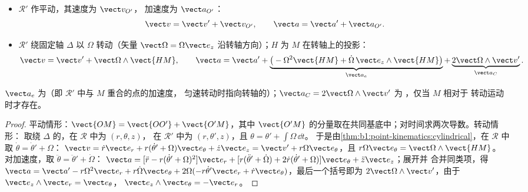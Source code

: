\begin{theorem}[速度与加速度的合成]\label{thm:b1:non-inertial-frames:composition}
\begin{itemize}
  \item $\mathcal R'$ 作平动，其速度为 $\vect v_{O'}$，
        加速度为 $\vect a_{O'}$：
        \[
        \vect v = \vect v' + \vect v_{O'}, \qquad \vect a = \vect a' + \vect a_{O'} .
        \]
  \item $\mathcal R'$ 绕固定轴 $\Delta$ 以 $\Omega$ 转动（矢量
        $\vect\Omega = \Omega\vect e_z$ 沿转轴方向）；$H$ 为
        $M$ 在转轴上的投影：
        \[
        \vect v = \vect v' + \vect\Omega\wedge\vect{HM}, \qquad
        \vect a = \vect a' + \underbrace{\big(-\Omega^2\vect{HM} + \dot\Omega\,\vect e_z\wedge\vect{HM}\big)}_{\vect a_e}
        + \underbrace{2\vect\Omega\wedge\vect v'}_{\vect a_C} .
        \]
\end{itemize}
$\vect a_e$ 为\emph{}（即
$\mathcal R'$ 中与 $M$ 重合的点的加速度，
匀速转动时指向转轴的）；$\vect a_C = 2\vect\Omega\wedge\vect v'$ 为
\emph{}，仅当 $M$ 相对于
转动运动时才存在。
\end{theorem}

\begin{proof}
平动情形：$\vect{OM} = \vect{OO'} + \vect{O'M}$，其中
$\vect{O'M}$ 的分量取在共同基底中；对时间求两次导数。转动情形：
取绕 $\Delta$ 的，在 $\mathcal R$ 中为 $(r, \theta, z)$，
在 $\mathcal R'$ 中为 $(r, \theta', z)$，且 $\theta = \theta' + \int\Omega\,\dd t$。
于是由\cref{thm:b1:point-kinematics:cylindrical}，在 $\mathcal R$ 中取
$\dot\theta = \dot\theta' + \Omega$：
$\vect v = \dot r\vect e_r + r(\dot\theta' + \Omega)\vect e_\theta + \dot z\vect e_z
= \vect v' + r\Omega\vect e_\theta$，且 $r\Omega\vect e_\theta = \vect\Omega\wedge\vect{HM}$。
对加速度，取 $\ddot\theta = \ddot\theta' + \dot\Omega$：
$\vect a = [\ddot r - r(\dot\theta' + \Omega)^2]\vect e_r + [r(\ddot\theta' + \dot\Omega)
+ 2\dot r(\dot\theta' + \Omega)]\vect e_\theta + \ddot z\vect e_z$；展开并
合并同类项，得 $\vect a = \vect a' - r\Omega^2\vect e_r + r\dot\Omega\vect e_\theta
+ 2\Omega(-r\dot\theta'\vect e_r + \dot r\vect e_\theta)$，最后一个括号即为
$2\vect\Omega\wedge\vect v'$，由于 $\vect e_z\wedge\vect e_r = \vect e_\theta$，
$\vect e_z\wedge\vect e_\theta = -\vect e_r$。
\end{proof}

